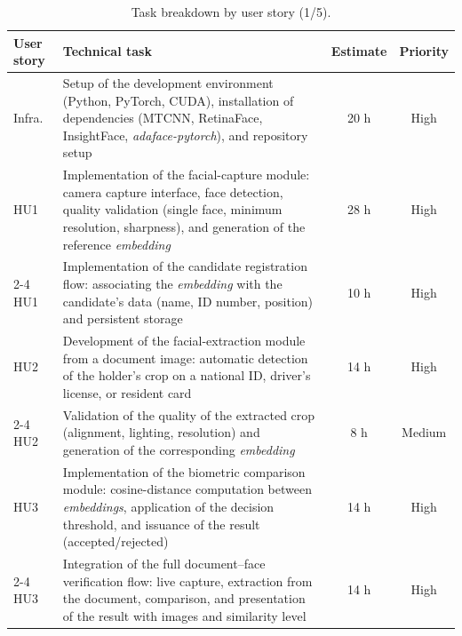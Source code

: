 \documentclass[
  11pt, %
]{charter}
\begin{document}
\begin{table}[htpb]
  \centering
  \caption{Task breakdown by user story (1/5).}
  \begin{tabularx}{\linewidth}{@{}|X|X|c|c|@{}}
    \hline
    \rowcolor[HTML]{C0C0C0}
    User story & Technical task & Estimate & Priority \\ \hline

    Infra. & Setup of the development environment (Python, PyTorch, CUDA), installation of dependencies (MTCNN, RetinaFace, InsightFace, \textit{adaface-pytorch}), and repository setup & 20 h & High \\ \hline
    HU1 & Implementation of the facial-capture module: camera capture interface, face detection, quality validation (single face, minimum resolution, sharpness), and generation of the reference \textit{embedding} & 28 h & High \\ \cline{2-4}
    HU1 & Implementation of the candidate registration flow: associating the \textit{embedding} with the candidate's data (name, ID number, position) and persistent storage & 10 h & High \\ \hline

    HU2 & Development of the facial-extraction module from a document image: automatic detection of the holder's crop on a national ID, driver's license, or resident card & 14 h & High \\ \cline{2-4}
    HU2 & Validation of the quality of the extracted crop (alignment, lighting, resolution) and generation of the corresponding \textit{embedding} & 8 h & Medium \\ \hline

    HU3 & Implementation of the biometric comparison module: cosine-distance computation between \textit{embeddings}, application of the decision threshold, and issuance of the result (accepted/rejected) & 14 h & High \\ \cline{2-4}
    HU3 & Integration of the full document--face verification flow: live capture, extraction from the document, comparison, and presentation of the result with images and similarity level & 14 h & High \\ \hline

  \end{tabularx}
\end{table}
\end{document}
